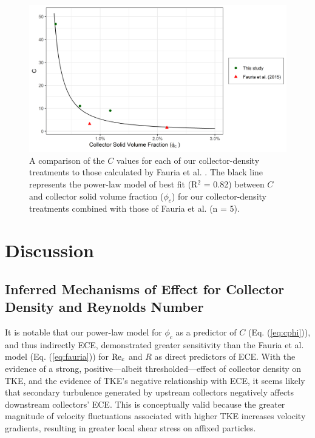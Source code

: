 \documentclass[geosciences,article,submit,moreauthors,pdftex]{Definitions/mdpi}
\begin{document}
\begin{figure}[H]
\centering
\includegraphics[width=5in]{../pics/cphiplot.png}
\caption{A comparison of the $C$ values for each of our collector-density treatments to those calculated by Fauria et al. \cite{Fauria_2015}. The black line represents the power-law model of best fit (R$^2$ = 0.82) between $C$ and collector solid volume fraction ($\phi_c$) for our collector-density treatments combined with those of Fauria et al. (n = 5).}
\label{fig:cphi}
\end{figure}   

\section{Discussion}

\subsection{Inferred Mechanisms of Effect for Collector Density and Reynolds Number}

It is notable that our power-law model for $\phi_c$ as a predictor of $C$ (Eq. (\ref{eq:cphi})), and thus indirectly ECE, demonstrated greater sensitivity than the Fauria et al. \cite{Fauria_2015} model (Eq. (\ref{eq:fauria})) for $\mathrm{Re}_c$ and $R$ as direct predictors of ECE. With the evidence of a strong, positive---albeit thresholded---effect of collector density on TKE, and the evidence of TKE's negative relationship with ECE, it seems likely that secondary turbulence generated by upstream collectors negatively affects downstream collectors' ECE. This is conceptually valid because the greater magnitude of velocity fluctuations associated with higher TKE increases velocity gradients, resulting in greater local shear stress on affixed particles.
\end{document}
